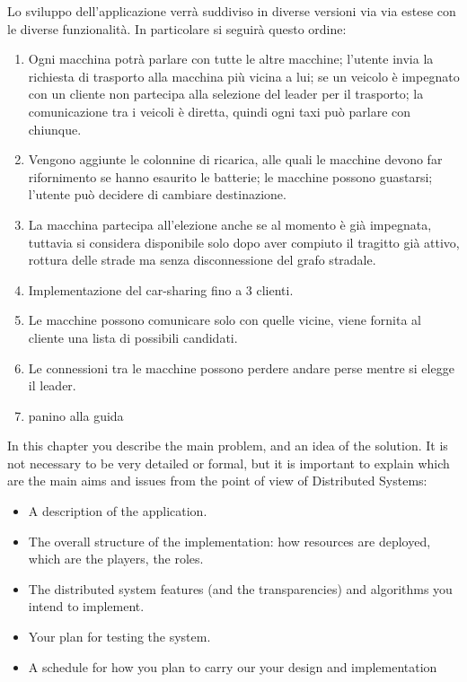 Lo sviluppo dell'applicazione verrà suddiviso in diverse versioni via via estese con le diverse funzionalità. In particolare si seguirà questo ordine:
\begin{enumerate}
	\item Ogni macchina potrà parlare con tutte le altre macchine; l'utente invia la richiesta di trasporto alla macchina più vicina a lui; se un veicolo è impegnato con un cliente non partecipa alla selezione del leader per il trasporto; la comunicazione tra i veicoli è diretta, quindi ogni taxi può parlare con chiunque.
	\item Vengono aggiunte le colonnine di ricarica, alle quali le macchine devono far rifornimento se hanno esaurito le batterie; le macchine possono guastarsi; l'utente può decidere di cambiare destinazione.
	\item La macchina partecipa all'elezione anche se al momento è già impegnata, tuttavia si considera disponibile solo dopo aver compiuto il tragitto già attivo, rottura delle strade ma senza disconnessione del grafo stradale.
	\item Implementazione del car-sharing fino a 3 clienti.
	\item Le macchine possono comunicare solo con quelle vicine, viene fornita al cliente una lista di possibili candidati.
	\item Le connessioni tra le macchine possono perdere andare perse mentre si elegge il leader.
	\item panino alla guida
\end{enumerate}

In this chapter you describe the main problem, and an idea of the solution. It is not necessary to be very detailed or formal, but it is important to explain which are the main aims and issues from the point of view of Distributed Systems:


\begin{itemize}
	\item A description of the application.
	\item The overall structure of the implementation: how resources are deployed, which are the players, the roles.
	\item The distributed system features (and the transparencies) and algorithms you intend to implement.
	\item Your plan for testing the system.
	\item A schedule for how you plan to carry our your design and implementation
\end{itemize}
